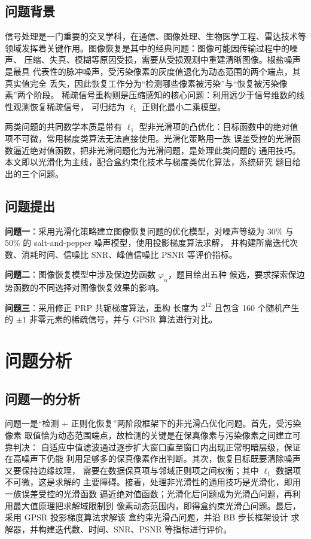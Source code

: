 \documentclass[withoutpreface,bwprint]{cumcmthesis}
\begin{document}
\subsection{问题背景}

信号处理是一门重要的交叉学科，在通信、图像处理、生物医学工程、雷达技术等
领域发挥着关键作用。图像恢复是其中的经典问题：图像可能因传输过程中的噪声、
压缩、失真、模糊等原因受损，需要从受损观测中重建清晰图像。椒盐噪声是最具
代表性的脉冲噪声，受污染像素的灰度值退化为动态范围的两个端点，其真实值完全
丢失，因此恢复工作分为``检测哪些像素被污染''与``恢复被污染像素''两个阶段。
稀疏信号重构则是压缩感知的核心问题：利用远少于信号维数的线性观测恢复稀疏信号，
可归结为 $\ell_1$ 正则化最小二乘模型。

两类问题的共同数学本质是带有 $\ell_1$ 型非光滑项的凸优化：目标函数中的绝对值
项不可微，常用梯度类算法无法直接使用。光滑化策略用一族
误差受控的光滑函数逼近绝对值函数，把非光滑问题化为光滑问题，是处理此类问题的
通用技巧。本文即以光滑化为主线，配合盒约束化技术与梯度类优化算法，系统研究
题目给出的三个问题。

\subsection{问题提出}

\textbf{问题一}：采用光滑化策略建立图像恢复问题的优化模型，对噪声等级为
$30\%$ 与 $50\%$ 的 salt-and-pepper 噪声模型，使用投影梯度算法求解，
并构建所需迭代次数、消耗时间、信噪比 SNR、峰值信噪比 PSNR 等评价指标。

\textbf{问题二}：图像恢复模型中涉及保边势函数 $\varphi_{\alpha}$，题目给出五种
候选，要求探索保边势函数的不同选择对图像恢复效果的影响。

\textbf{问题三}：采用修正 PRP 共轭梯度算法，重构
长度为 $2^{12}$ 且包含 160 个随机产生的 $\pm1$ 非零元素的稀疏信号，并与
GPSR 算法进行对比。

\section{问题分析}

\subsection{问题一的分析}

问题一是``检测 + 正则化恢复''两阶段框架下的非光滑凸优化问题。首先，受污染像素
取值恰为动态范围端点，故检测的关键是在保真像素与污染像素之间建立可靠判决：
自适应中值滤波通过逐步扩大窗口直至窗口内出现正常明暗层级，保证在高噪声下仍能
利用足够多的保真像素作出判断。其次，恢复目标既要清除噪声又要保持边缘纹理，
需要在数据保真项与邻域正则项之间权衡；其中 $\ell_1$ 数据项不可微，这是求解的
主要障碍。接着，处理非光滑性的通用技巧是光滑化，即用一族误差受控的光滑函数
逼近绝对值函数；光滑化后问题成为光滑凸问题，再利用最大值原理把求解域限制到
像素动态范围内，即得盒约束光滑凸问题。最后，采用 GPSR 投影梯度算法求解该
盒约束光滑凸问题，并沿 BB 步长框架设计
求解器，并构建迭代数、时间、SNR、PSNR 等指标进行评价。
\end{document}
